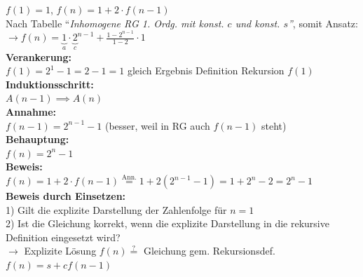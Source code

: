 \documentclass[8pt,landscape]{scrartcl}
\begin{document}
\begin{multicols}{3}
$f(1) = 1$, $f(n) = 1 + 2 \cdot f(n-1)$\\
Nach Tabelle ``\textit{Inhomogene RG 1. Ordg. mit konst. $c$ und konst. $s$''}, somit Ansatz:\\
$\rightarrow f(n) = \underbrace{1}_{a} \cdot {\underbrace{2}_{c}}^{n-1} + \frac{1 - 2^{n-1}}{1-2} \cdot 1$\\

\textbf{Verankerung:}\\
$f(1) = 2^1 - 1 = 2-1 = 1$ gleich Ergebnis Definition Rekursion $f(1)$\\

\textbf{Induktionsschritt:}\\
$A(n-1) \implies A(n)$\\

\textbf{Annahme:}\\
$f(n-1) = 2^{n-1} - 1$ (besser, weil in RG auch $f(n-1)$ steht)\\

\textbf{Behauptung:}\\
$f(n) = 2^n - 1$\\

\textbf{Beweis:}\\
$f(n) = 1 + 2 \cdot f(n-1) \stackrel{\mbox{Ann.}}{=} 1 + 2(2^{n-1} - 1) = 1 + 2^n - 2 = 2^n -1$\\



\textbf{Beweis durch Einsetzen:}\\
1) Gilt die explizite Darstellung der Zahlenfolge f\"ur $n=1$\\
2) Ist die Gleichung korrekt, wenn die explizite Darstellung in die rekursive Definition eingesetzt wird?\\
$\rightarrow$ Explizite L\"osung $f(n) \stackrel{?}{=}$ Gleichung gem. Rekursionsdef. $f(n) = s + c f(n-1)$






\end{multicols}
\end{document}
